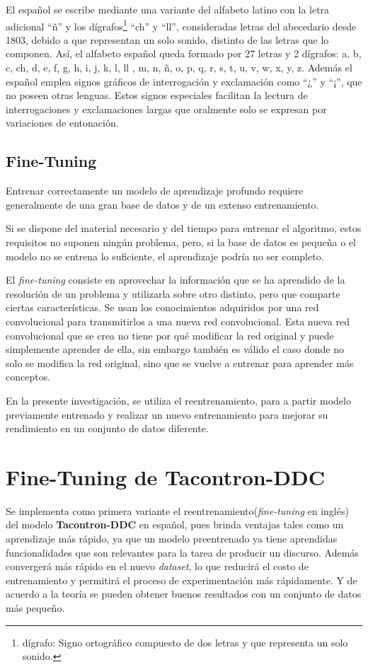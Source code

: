 El español se escribe mediante una variante del alfabeto latino con la letra adicional ``ñ'' y los dígrafos\footnote{dígrafo: Signo ortográfico compuesto de dos letras y que representa un solo sonido.} ``ch'' y ``ll'', consideradas letras del abecedario desde 1803, debido a que representan un solo sonido, distinto de las letras que lo componen. Así, el alfabeto español queda formado por 27 letras y 2 dígrafos: a, b, c, ch, d, e, f, g, h, i, j, k, l, ll , m, n, ñ, o, p, q, r, s, t, u, v, w, x, y, z. Además el español emplea signos gráficos de interrogación y exclamación como ``¿'' y ``¡'', que no poseen otras lenguas. Estos signos especiales facilitan la lectura de interrogaciones y exclamaciones largas que oralmente solo se expresan por variaciones de entonación. 

\subsection*{Fine-Tuning}
Entrenar correctamente un modelo de aprendizaje profundo requiere generalmente de una gran base de datos y de un extenso entrenamiento.

Si se dispone del material necesario y del tiempo para entrenar el algoritmo, estos requisitos no suponen ningún problema, pero, si la base de datos es pequeña o el modelo no se entrena lo suficiente, el aprendizaje podría no ser completo.

El \textit{fine-tuning} consiste en aprovechar la información que se ha aprendido de la resolución de un problema y utilizarla sobre otro distinto, pero que comparte ciertas características. Se usan los conocimientos adquiridos por una red convolucional para transmitirlos a una nueva red convolucional. Esta nueva red convolucional que se crea no tiene por qué modificar la red original y puede simplemente aprender de ella, sin embargo también es válido el caso donde no solo se modifica la red original, sino que se vuelve a entrenar para aprender más conceptos.

En la presente investigación, se utiliza el reentrenamiento, para a partir modelo previamente entrenado y realizar un nuevo entrenamiento para mejorar su rendimiento en un conjunto de datos diferente.\\

\section{Fine-Tuning de Tacontron-DDC}

Se implementa como primera variante el reentrenamiento(\textit{fine-tuning} en inglés) del modelo \textbf{Tacontron-DDC} en español, pues brinda ventajas tales como un aprendizaje más rápido, ya que un modelo preentrenado ya tiene aprendidas funcionalidades que son relevantes para la tarea de producir un discurso. Además convergerá más rápido en el nuevo \textit{dataset}, lo que reducirá el costo de entrenamiento y permitirá el proceso de experimentación más rápidamente. Y de acuerdo a la teoría se pueden obtener buenos resultados con un conjunto de datos más pequeño.\\

